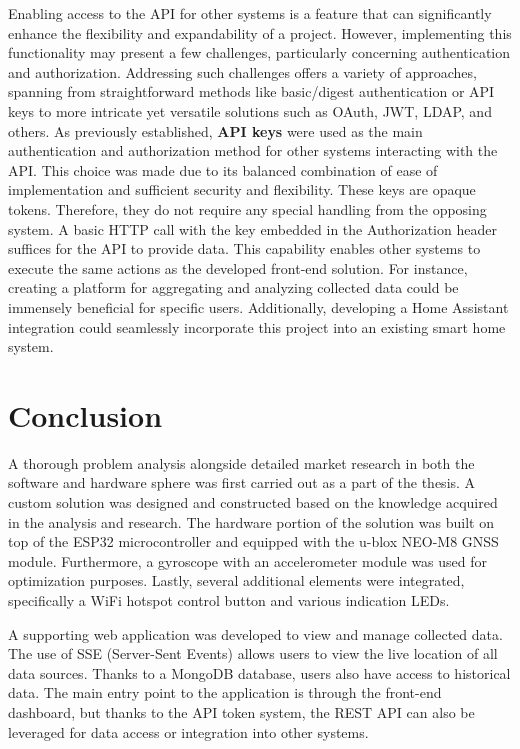 \documentclass[FM,BP,EN,fonts]{tulthesis}
\begin{document}
Enabling access to the API for other systems is a feature that can significantly enhance the flexibility and expandability of a project. However, implementing this functionality may present a few challenges, particularly concerning authentication and authorization. Addressing such challenges offers a variety of approaches, spanning from straightforward methods like basic/digest authentication or API keys to more intricate yet versatile solutions such as OAuth, JWT, LDAP, and others. As previously established, \textbf{API keys} were used as the main authentication and authorization method for other systems interacting with the API. This choice was made due to its balanced combination of ease of implementation and sufficient security and flexibility. These keys are opaque tokens. Therefore, they do not require any special handling from the opposing system. A basic HTTP call with the key embedded in the Authorization header suffices for the API to provide data. This capability enables other systems to execute the same actions as the developed front-end solution. For instance, creating a platform for aggregating and analyzing collected data could be immensely beneficial for specific users. Additionally, developing a Home Assistant integration could seamlessly incorporate this project into an existing smart home system.

\chapter*{Conclusion}
A thorough problem analysis alongside detailed market research in both the software and hardware sphere was first carried out as a part of the thesis. A custom solution was designed and constructed based on the knowledge acquired in the analysis and research. The hardware portion of the solution was built on top of the ESP32 microcontroller and equipped with the u-blox NEO-M8 GNSS module. Furthermore, a gyroscope with an accelerometer module was used for optimization purposes. Lastly, several additional elements were integrated, specifically a WiFi hotspot control button and various indication LEDs.

A supporting web application was developed to view and manage collected data. The use of SSE (Server-Sent Events) allows users to view the live location of all data sources. Thanks to a MongoDB database, users also have access to historical data. The main entry point to the application is through the front-end dashboard, but thanks to the API token system, the REST API can also be leveraged for data access or integration into other systems.
\end{document}
